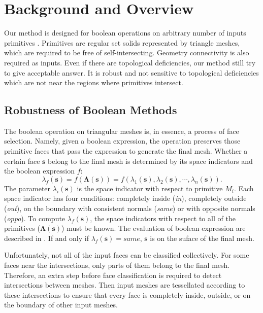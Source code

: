 
\section{Background and Overview}

\label{sec:overview}

Our method is designed for boolean operations on arbitrary number of inputs primitives \cite{requicha1985boolean}. Primitives are regular set solids represented by triangle meshes, which are required to be free of self-intersecting. Geometry connectivity is also required as inputs. Even if there are topological deficiencies, our method still try to give acceptable answer. It is robust and not sensitive to topological deficiencies which are not near the regions where primitives intersect.


\subsection{Robustness of Boolean Methods}
\label{sec:paradigm}

The boolean operation on triangular meshes is, in essence, a process of face selection. Namely, given a boolean expression, the operation preserves those primitive faces that pass the expression to generate the final mesh. Whether a certain face $\bm{s}$ belong to the final mesh is determined by its space indicators and the boolean expression $f$:
\begin{equation}
\lambda_f(\bm{s}) = f(\boldsymbol{\Lambda}(\bm{s})) = f(\lambda_1(\bm{s}), \lambda_2(\bm{s}), \cdots, \lambda_n(\bm{s})).
\end{equation}
The parameter $\lambda_i(\bm{s})$ is the space indicator with respect to primitive $M_i$. Each space indicator has four conditions: completely inside (\emph{in}), completely outside (\emph{out}), on the boundary with consistent normals (\emph{same}) or with opposite normals (\emph{oppo}). To compute $\lambda_f(\bm{s})$, the space indicators with respect to all of the primitives ($\boldsymbol{\Lambda}(\bm{s})$) must be known.
The evaluation of boolean expression are described in \cite{douze2015quickcsg,feito2013fast}. If and only if $\lambda_f(\bm{s})=same$, $\bm{s}$ is on the suface of the final mesh.

Unfortunately, not all of the input faces can be classified collectively. For some faces near the intersections, only parts of them belong to the final mesh. Therefore, an extra step before face classification is required to detect intersections between meshes. Then input meshes are tessellated according to these intersections to ensure that every face is completely inside, outside, or on the boundary of other input meshes.

